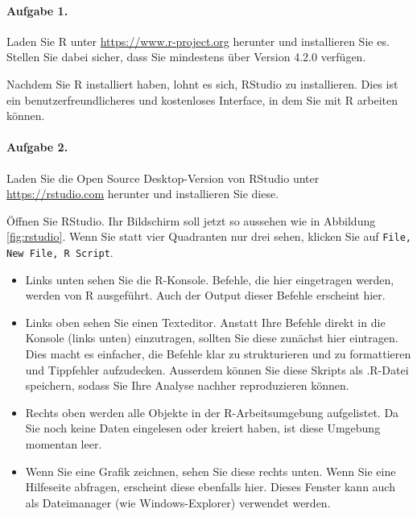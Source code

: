 \documentclass[oneside, 10pt]{book}\usepackage[]{graphicx}\usepackage[]{xcolor}
\begin{document}
\paragraph{Aufgabe 1.}
Laden Sie R unter \url{https://www.r-project.org} herunter
und installieren Sie es.
Stellen Sie dabei sicher, dass Sie mindestens über Version 4.2.0 verfügen.

Nachdem Sie R installiert haben, lohnt es sich, RStudio zu installieren.
Dies ist ein benutzerfreundlicheres und kostenloses Interface,
in dem Sie mit R arbeiten können.

\paragraph{Aufgabe 2.} 
Laden Sie die Open Source Desktop-Version von RStudio unter \url{https://rstudio.com} 
herunter und installieren Sie diese.

Öffnen Sie RStudio. Ihr Bildschirm soll jetzt
so aussehen wie in Abbildung \ref{fig:rstudio}.
Wenn Sie statt vier Quadranten nur drei sehen,
klicken Sie auf \texttt{File, New File, R Script}.

\begin{itemize}
\item Links unten sehen Sie die R-Konsole.
Befehle, die hier eingetragen werden,
werden von R ausgeführt.
Auch der Output dieser Befehle erscheint hier.

\item Links oben sehen Sie einen Texteditor.
 Anstatt Ihre Befehle direkt in die Konsole (links unten)
 einzutragen, sollten Sie diese zunächst hier eintragen.
 Dies macht es einfacher, die Befehle klar zu strukturieren
 und zu formattieren und
 Tippfehler aufzudecken. Ausserdem können Sie diese
 Skripts als .R-Datei
 speichern, sodass Sie Ihre Analyse nachher
 reproduzieren können.

\item Rechts oben werden alle Objekte in der R-Arbeitsumgebung aufgelistet.
 Da Sie noch keine Daten eingelesen oder kreiert haben,
 ist diese Umgebung momentan leer.

\item Wenn Sie eine Grafik zeichnen, sehen Sie diese rechts unten. Wenn Sie eine Hilfeseite abfragen, erscheint diese ebenfalls hier. Dieses Fenster kann auch als Dateimanager
 (wie Windows-Explorer) verwendet werden.
\end{itemize}
\end{document}
